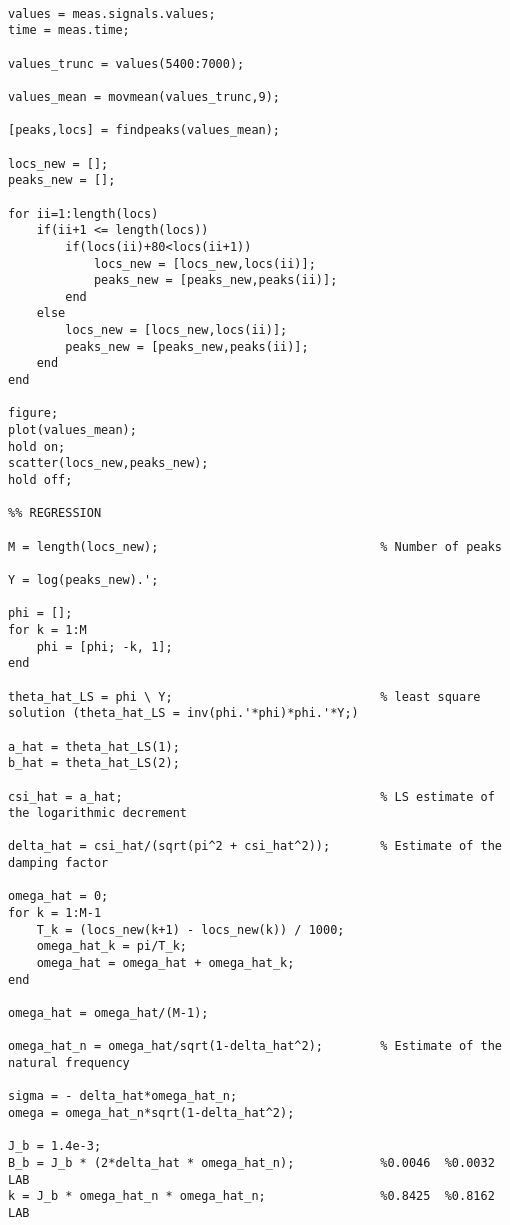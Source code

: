 \begin{lstlisting}[caption={Estimation Parameters.}, label={lst:est_param}]
%% ESTIMATION PARAMETERS

values = meas.signals.values;
time = meas.time;

values_trunc = values(5400:7000);                      

values_mean = movmean(values_trunc,9);              

[peaks,locs] = findpeaks(values_mean);

locs_new = [];
peaks_new = [];

for ii=1:length(locs)
    if(ii+1 <= length(locs))
        if(locs(ii)+80<locs(ii+1))                  
            locs_new = [locs_new,locs(ii)];
            peaks_new = [peaks_new,peaks(ii)];
        end
    else
        locs_new = [locs_new,locs(ii)];
        peaks_new = [peaks_new,peaks(ii)];
    end
end

figure;
plot(values_mean);
hold on;
scatter(locs_new,peaks_new);
hold off;

%% REGRESSION

M = length(locs_new);                               % Number of peaks

Y = log(peaks_new).';

phi = [];
for k = 1:M
    phi = [phi; -k, 1];
end
             
theta_hat_LS = phi \ Y;                             % least square solution (theta_hat_LS = inv(phi.'*phi)*phi.'*Y;)

a_hat = theta_hat_LS(1);                
b_hat = theta_hat_LS(2);

csi_hat = a_hat;                                    % LS estimate of the logarithmic decrement

delta_hat = csi_hat/(sqrt(pi^2 + csi_hat^2));       % Estimate of the damping factor   

omega_hat = 0;
for k = 1:M-1                                        
    T_k = (locs_new(k+1) - locs_new(k)) / 1000;
    omega_hat_k = pi/T_k;
    omega_hat = omega_hat + omega_hat_k;
end

omega_hat = omega_hat/(M-1);                        

omega_hat_n = omega_hat/sqrt(1-delta_hat^2);        % Estimate of the natural frequency

sigma = - delta_hat*omega_hat_n;
omega = omega_hat_n*sqrt(1-delta_hat^2);

J_b = 1.4e-3;
B_b = J_b * (2*delta_hat * omega_hat_n);            %0.0046  %0.0032 LAB
k = J_b * omega_hat_n * omega_hat_n;                %0.8425  %0.8162 LAB
\end{lstlisting}
